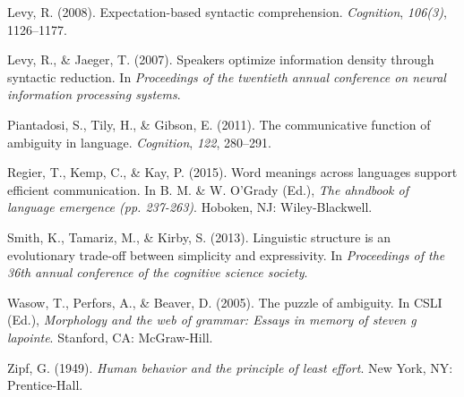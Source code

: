 \documentclass[10pt, letterpaper]{article}
\begin{document}
\hypertarget{ref-Levy2008a}{}
Levy, R. (2008). Expectation-based syntactic comprehension.
\emph{Cognition}, \emph{106(3)}, 1126--1177.

\hypertarget{ref-LevyJaeger2007a}{}
Levy, R., \& Jaeger, T. (2007). Speakers optimize information density
through syntactic reduction. In \emph{Proceedings of the twentieth
annual conference on neural information processing systems}.

\hypertarget{ref-Piantadosi2011a}{}
Piantadosi, S., Tily, H., \& Gibson, E. (2011). The communicative
function of ambiguity in language. \emph{Cognition}, \emph{122},
280--291.

\hypertarget{ref-RegierKempKay2015a}{}
Regier, T., Kemp, C., \& Kay, P. (2015). Word meanings across languages
support efficient communication. In B. M. \& W. O'Grady (Ed.), \emph{The
ahndbook of language emergence (pp. 237-263)}. Hoboken, NJ:
Wiley-Blackwell.

\hypertarget{ref-SmithTamarizKirby2013a}{}
Smith, K., Tamariz, M., \& Kirby, S. (2013). Linguistic structure is an
evolutionary trade-off between simplicity and expressivity. In
\emph{Proceedings of the 36th annual conference of the cognitive science
society}.

\hypertarget{ref-WasowPerforsBeaver2005a}{}
Wasow, T., Perfors, A., \& Beaver, D. (2005). The puzzle of ambiguity.
In CSLI (Ed.), \emph{Morphology and the web of grammar: Essays in memory
of steven g lapointe}. Stanford, CA: McGraw-Hill.

\hypertarget{ref-Zipf1949a}{}
Zipf, G. (1949). \emph{Human behavior and the principle of least
effort}. New York, NY: Prentice-Hall.


\end{document}

